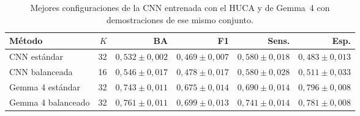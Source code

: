 \begin{table}[H]
  \centering
  \small
  \begin{tabularx}{\textwidth}{Xrrrrr}
    \toprule
    Método & \(K\) & BA & F1 & Sens. & Esp. \\
    \midrule
    CNN estándar & 32 & \(0,532 \pm 0,002\) & \(0,469 \pm 0,007\) & \(0,580 \pm 0,018\) & \(0,483 \pm 0,013\) \\
    CNN balanceada & 16 & \(0,546 \pm 0,017\) & \(0,478 \pm 0,017\) & \(0,580 \pm 0,028\) & \(0,511 \pm 0,033\) \\
    Gemma 4 estándar & 32 & \(0,743 \pm 0,011\) & \(0,675 \pm 0,014\) & \(0,690 \pm 0,014\) & \(0,796 \pm 0,008\) \\
    Gemma 4 balanceado & 32 & \(0,761 \pm 0,011\) & \(0,699 \pm 0,013\) & \(0,741 \pm 0,014\) & \(0,781 \pm 0,008\) \\
    \bottomrule
  \end{tabularx}
  \caption{Mejores configuraciones de la CNN entrenada con el HUCA y de Gemma~4 con demostraciones de ese mismo conjunto.}
  \label{tab:comparacion_clinica_cnn}
  \resultstablenote
\end{table}
